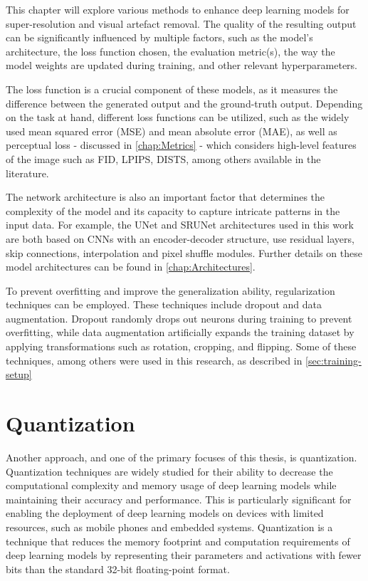 \label{chap:Optimizations}

This chapter will explore various methods to enhance deep learning models for super-resolution and visual artefact removal. The quality of the resulting output can be significantly influenced by multiple factors, such as the model's architecture, the loss function chosen, the evaluation metric(s), the way the model weights are updated during training, and other relevant hyperparameters.

The loss function is a crucial component of these models, as it measures the difference between the generated output and the ground-truth output. Depending on the task at hand, different loss functions can be utilized, such as the widely used mean squared error (MSE) and mean absolute error (MAE), as well as perceptual loss - discussed in \cref{chap:Metrics} - which considers high-level features of the image such as FID, LPIPS, DISTS, among others available in the literature.

The network architecture is also an important factor that determines the complexity of the model and its capacity to capture intricate patterns in the input data. For example, the UNet and SRUNet architectures used in this work are both based on CNNs with an encoder-decoder structure, use residual layers, skip connections, interpolation and pixel shuffle modules. Further details on these model architectures can be found in \cref{chap:Architectures}.

To prevent overfitting and improve the generalization ability, regularization techniques can be employed. These techniques include dropout and data augmentation. Dropout randomly drops out neurons during training to prevent overfitting, while data augmentation artificially expands the training dataset by applying transformations such as rotation, cropping, and flipping. Some of these techniques, among others were used in this research, as described in \cref{sec:training-setup}

\section{Quantization}
\label{sec:quantization}

Another approach, and one of the primary focuses of this thesis, is quantization. Quantization techniques are widely studied for their ability to decrease the computational complexity and memory usage of deep learning models while maintaining their accuracy and performance. This is particularly significant for enabling the deployment of deep learning models on devices with limited resources, such as mobile phones and embedded systems. Quantization is a technique that reduces the memory footprint and computation requirements of deep learning models by representing their parameters and activations with fewer bits than the standard 32-bit floating-point format.

